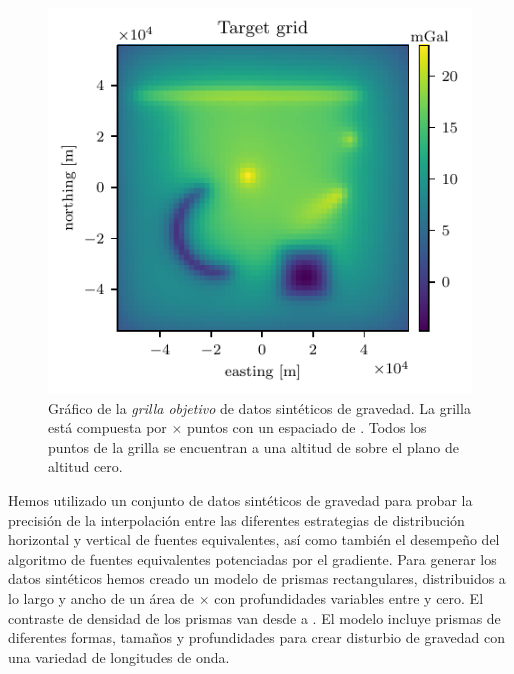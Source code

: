 \begin{figure}[tb]
    \centering
    \includegraphics[width=0.7\linewidth]{figs/eql-gradient-boosted/target-grid.pdf}
    \caption{
        Gráfico de la \emph{grilla objetivo} de datos sintéticos de gravedad.
        La grilla está compuesta por
        \TargetEastingSize{}$\times$\TargetNorthingSize{} puntos
        con un espaciado de \TargetSpacing{}.
        Todos los puntos de la grilla se encuentran a una altitud de
        \TargetHeight{} sobre el plano de altitud cero.
    }
    \label{fig:synthetic-target}
\end{figure}

Hemos utilizado un conjunto de datos sintéticos de gravedad para probar la
precisión de la interpolación entre las diferentes estrategias de distribución
horizontal y vertical de fuentes equivalentes, así como también el desempeño
del algoritmo de fuentes equivalentes potenciadas por el gradiente.
Para generar los datos sintéticos hemos creado un modelo de
\NPrisms{} prismas rectangulares, distribuidos a lo largo y ancho de un área de
\ModelEasting{}$\times$\ModelNorthing{} con profundidades variables entre
\ModelDepth{} y cero.
El contraste de densidad de los prismas van desde \ModelMinDensity{} a
\ModelMaxDensity{}.
El modelo incluye prismas de diferentes formas, tamaños y profundidades para
crear disturbio de gravedad con una variedad de longitudes de onda.

